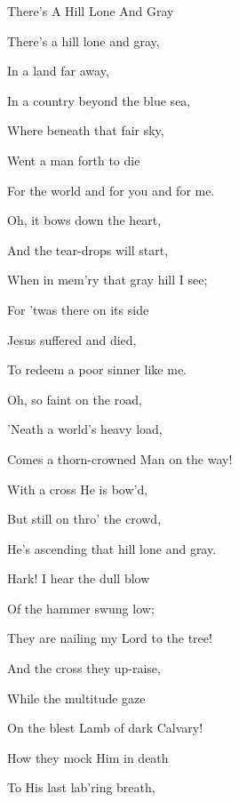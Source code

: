 \documentclass[12pt]{book}
\begin{document}
\begin{song}{There's A Hill Lone And Gray}{}
  {\SBPubDom}
  {}
  {}
  {}

  \begin{SBVerse}
    There's a hill lone and gray,

    In a land far away,

    In a country beyond the blue sea,

    Where beneath that fair sky,

    Went a man forth to die

    For the world and for you and for me.
  \end{SBVerse}

  \begin{SBOpGroup}
    Oh, it bows down the heart,

    And the tear-drops will start,

    When in mem'ry that gray hill I see;

    For 'twas there on its side

    Jesus suffered and died,

    To redeem a poor sinner like me.
  \end{SBOpGroup}

  \begin{SBVerse}
    Oh, so faint on the road,

    'Neath a world's heavy load,

    Comes a thorn-crowned Man on the way!

    With a cross He is bow'd,

    But still on thro' the crowd,

    He's ascending that hill lone and gray.
  \end{SBVerse}

  \begin{SBVerse}
    Hark! I hear the dull blow

    Of the hammer swung low;

    They are nailing my Lord to the tree!

    And the cross they up-raise,

    While the multitude gaze

    On the blest Lamb of dark Calvary!
  \end{SBVerse}

  \begin{SBVerse}
    How they mock Him in death

    To His last lab'ring breath,


\end{SBVerse}
\end{song}
\end{document}
